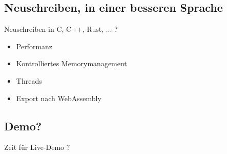 \documentclass[12pt]{beamer}
\begin{document}
\subsection{Neuschreiben, in einer besseren Sprache}
\begin{frame}
	Neuschreiben in C, C++, Rust, ... ?
	\begin{itemize}[<+(1)->]
		\item Performanz
		\item Kontrolliertes Memorymanagement
		\item Threads
		\item Export nach WebAssembly
	\end{itemize}
\end{frame}

\subsection{Demo?}
\begin{frame}
	\begin{center}
		\Huge Zeit für Live-Demo ?
	\end{center}
\end{frame}
\end{document}
